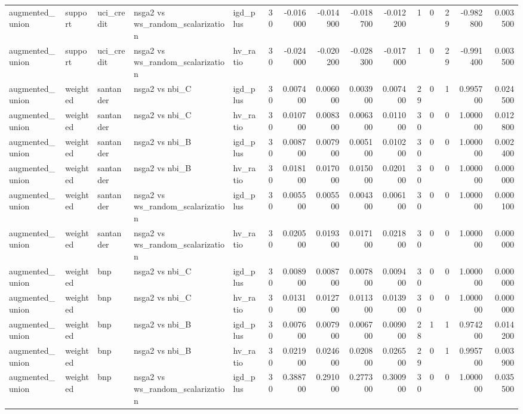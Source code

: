 \begin{landscape}
\begin{longtable}{lllllrrrrrrrrrr}
augmented\_union & support & uci\_credit & nsga2 vs ws\_random\_scalarization & igd\_plus & 30 & -0.016000 & -0.014900 & -0.018700 & -0.012200 & 1 & 0 & 29 & -0.982800 & 0.003500 \\
augmented\_union & support & uci\_credit & nsga2 vs ws\_random\_scalarization & hv\_ratio & 30 & -0.024000 & -0.020200 & -0.028300 & -0.017000 & 1 & 0 & 29 & -0.991400 & 0.003500 \\
augmented\_union & weighted & santander & nsga2 vs nbi\_C & igd\_plus & 30 & 0.007400 & 0.006000 & 0.003900 & 0.007400 & 29 & 0 & 1 & 0.995700 & 0.024500 \\
augmented\_union & weighted & santander & nsga2 vs nbi\_C & hv\_ratio & 30 & 0.010700 & 0.008300 & 0.006300 & 0.011000 & 30 & 0 & 0 & 1.000000 & 0.012800 \\
augmented\_union & weighted & santander & nsga2 vs nbi\_B & igd\_plus & 30 & 0.008700 & 0.007900 & 0.005100 & 0.010200 & 30 & 0 & 0 & 1.000000 & 0.002400 \\
augmented\_union & weighted & santander & nsga2 vs nbi\_B & hv\_ratio & 30 & 0.018100 & 0.017000 & 0.015000 & 0.020100 & 30 & 0 & 0 & 1.000000 & 0.000000 \\
augmented\_union & weighted & santander & nsga2 vs ws\_random\_scalarization & igd\_plus & 30 & 0.005500 & 0.005500 & 0.004300 & 0.006100 & 30 & 0 & 0 & 1.000000 & 0.000100 \\
augmented\_union & weighted & santander & nsga2 vs ws\_random\_scalarization & hv\_ratio & 30 & 0.020500 & 0.019300 & 0.017100 & 0.021800 & 30 & 0 & 0 & 1.000000 & 0.000000 \\
augmented\_union & weighted & bnp & nsga2 vs nbi\_C & igd\_plus & 30 & 0.008900 & 0.008700 & 0.007800 & 0.009400 & 30 & 0 & 0 & 1.000000 & 0.000000 \\
augmented\_union & weighted & bnp & nsga2 vs nbi\_C & hv\_ratio & 30 & 0.013100 & 0.012700 & 0.011300 & 0.013900 & 30 & 0 & 0 & 1.000000 & 0.000000 \\
augmented\_union & weighted & bnp & nsga2 vs nbi\_B & igd\_plus & 30 & 0.007600 & 0.007900 & 0.006700 & 0.009000 & 28 & 1 & 1 & 0.974200 & 0.014200 \\
augmented\_union & weighted & bnp & nsga2 vs nbi\_B & hv\_ratio & 30 & 0.021900 & 0.024600 & 0.020800 & 0.026500 & 29 & 0 & 1 & 0.995700 & 0.003900 \\
augmented\_union & weighted & bnp & nsga2 vs ws\_random\_scalarization & igd\_plus & 30 & 0.388700 & 0.291000 & 0.277300 & 0.300900 & 30 & 0 & 0 & 1.000000 & 0.035500 \\

\end{longtable}
\end{landscape}
